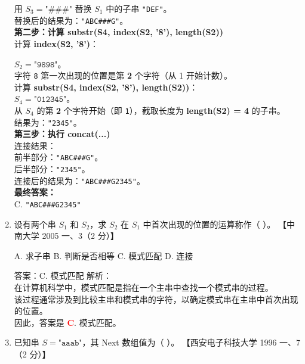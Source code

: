 \documentclass[lang=cn,newtx,10pt,scheme=chinese]{../../../elegantbook}
\begin{document}
\begin{enumerate}
    用 $S_3 = \texttt{"\#\#\#"}$ 替换 $S_1$ 中的子串 \texttt{"DEF"}。\\
    替换后的结果为：\texttt{"ABC\#\#\#G"}。\\

    \textbf{第二步：计算 substr(S4, index(S2, '8'), length(S2))}\\
    计算 \textbf{index(S2, '8')}：

    $S_2 = \texttt{"9898"}$。\\
    字符 \texttt{8} 第一次出现的位置是第 \textbf{2} 个字符（从 1 开始计数）。\\
    计算 \textbf{substr(S4, index(S2, '8'), length(S2))}：\\

    $S_4 = \texttt{"012345"}$。\\
    从 $S_4$ 的第 \textbf{2} 个字符开始（即 \texttt{1}），截取长度为 \textbf{length(S2) = 4} 的子串。\\
    结果为：\texttt{"2345"}。\\

    \textbf{第三步：执行 concat(...)}\\
    连接结果：\\
    前半部分：\texttt{"ABC\#\#\#G"}。\\
    后半部分：\texttt{"2345"}。\\
    连接后的结果为：\texttt{"ABC\#\#\#{G2345}"}。\\

    \textbf{最终答案：}\\
    C. \texttt{"ABC\#\#\#{G2345}"}\\
    \item 设有两个串 $S_1$ 和 $S_2$，求 $S_2$ 在 $S_1$ 中首次出现的位置的运算称作（ ）。  
    【中南大学 2005 一、3（2 分）】  

    A. 求子串 \quad B. 判断是否相等 \quad C. 模式匹配 \quad D. 连接  

    答案：C. 模式匹配
    解析：\\
    在计算机科学中，模式匹配是指在一个主串中查找一个模式串的过程。\\
    该过程通常涉及到比较主串和模式串的字符，以确定模式串在主串中首次出现的位置。\\
    因此，答案是 \textbf{\textcolor{red}{C}}. 模式匹配。\\

    \item 已知串 $S = \texttt{"aaab"}$，其 Next 数组值为（ ）。  
    【西安电子科技大学 1996 一、7（2 分）】 


\end{enumerate}
\end{document}
